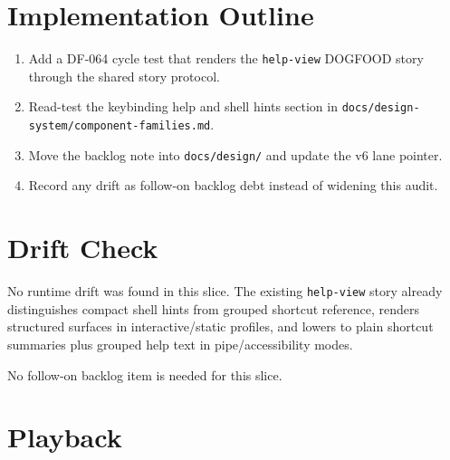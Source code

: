 \section{Implementation Outline}\label{record-105-implementation-outline}

\begin{enumerate}
\def\labelenumi{\arabic{enumi}.}
\tightlist
\item
  Add a DF-064 cycle test that renders the \texttt{h\allowbreak{}e\allowbreak{}l\allowbreak{}p\allowbreak{}-\allowbreak{}v\allowbreak{}i\allowbreak{}e\allowbreak{}w} DOGFOOD story through the shared story protocol.
\item
  Read-test the keybinding help and shell hints section in \texttt{d\allowbreak{}o\allowbreak{}c\allowbreak{}s\allowbreak{}/\allowbreak{}d\allowbreak{}e\allowbreak{}s\allowbreak{}i\allowbreak{}g\allowbreak{}n\allowbreak{}-\allowbreak{}s\allowbreak{}y\allowbreak{}s\allowbreak{}t\allowbreak{}e\allowbreak{}m\allowbreak{}/\allowbreak{}c\allowbreak{}o\allowbreak{}m\allowbreak{}p\allowbreak{}o\allowbreak{}n\allowbreak{}e\allowbreak{}n\allowbreak{}t\allowbreak{}-\allowbreak{}f\allowbreak{}a\allowbreak{}m\allowbreak{}i\allowbreak{}l\allowbreak{}i\allowbreak{}e\allowbreak{}s\allowbreak{}.\allowbreak{}m\allowbreak{}d}.
\item
  Move the backlog note into \texttt{d\allowbreak{}o\allowbreak{}c\allowbreak{}s\allowbreak{}/\allowbreak{}d\allowbreak{}e\allowbreak{}s\allowbreak{}i\allowbreak{}g\allowbreak{}n\allowbreak{}/} and update the v6 lane pointer.
\item
  Record any drift as follow-on backlog debt instead of widening this audit.
\end{enumerate}

\section{Drift Check}\label{record-105-drift-check}

No runtime drift was found in this slice. The existing \texttt{h\allowbreak{}e\allowbreak{}l\allowbreak{}p\allowbreak{}-\allowbreak{}v\allowbreak{}i\allowbreak{}e\allowbreak{}w} story already distinguishes compact shell hints from grouped shortcut reference, renders structured surfaces in interactive/static profiles, and lowers to plain shortcut summaries plus grouped help text in pipe/accessibility modes.

No follow-on backlog item is needed for this slice.

\section{Playback}\label{record-105-playback}

